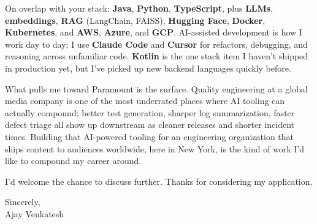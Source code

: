 \documentclass[letterpaper,11pt]{article}
\begin{document}
On overlap with your stack: \textbf{Java}, \textbf{Python}, \textbf{TypeScript}, plus \textbf{LLMs}, \textbf{embeddings}, \textbf{RAG} (LangChain, FAISS), \textbf{Hugging Face}, \textbf{Docker}, \textbf{Kubernetes}, and \textbf{AWS}, \textbf{Azure}, and \textbf{GCP}. AI-assisted development is how I work day to day; I use \textbf{Claude Code} and \textbf{Cursor} for refactors, debugging, and reasoning across unfamiliar code. \textbf{Kotlin} is the one stack item I haven't shipped in production yet, but I've picked up new backend languages quickly before.

What pulls me toward Paramount is the surface. Quality engineering at a global media company is one of the most underrated places where AI tooling can actually compound; better test generation, sharper log summarization, faster defect triage all show up downstream as cleaner releases and shorter incident times. Building that AI-powered tooling for an engineering organization that ships content to audiences worldwide, here in New York, is the kind of work I'd like to compound my career around.

I'd welcome the chance to discuss further. Thanks for considering my application.

\vspace{12pt}
Sincerely, \\
Ajay Venkatesh
\end{document}
